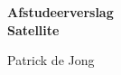 \begin{titlepage}
    \begin{center}
        \vspace*{1cm}
  
        \huge{\textbf{Afstudeerverslag}} \\ \vspace{0.2cm} \large 
        \large{\textbf{Satellite}} \\
        \vspace{0.2cm}
        \large
  
        Patrick de Jong \\
        \vfill
  
        \vspace{0.8cm}
    
    \end{center}
 \end{titlepage}
